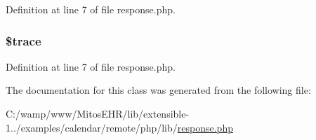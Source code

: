 \-Definition at line 7 of file response.\-php.

\hypertarget{class_response_a6983ad0ef833074b1af98e16d68ff4db}{
\subsubsection[{\$trace}]{\setlength{\rightskip}{0pt plus 5cm}\$trace}}\label{class_response_a6983ad0ef833074b1af98e16d68ff4db}


\-Definition at line 7 of file response.\-php.



\-The documentation for this class was generated from the following file\-:\begin{DoxyCompactItemize}
\item 
\-C\-:/wamp/www/\-Mitos\-E\-H\-R/lib/extensible-\/1../examples/calendar/remote/php/lib/\hyperlink{response_8php}{response.\-php}\end{DoxyCompactItemize}
